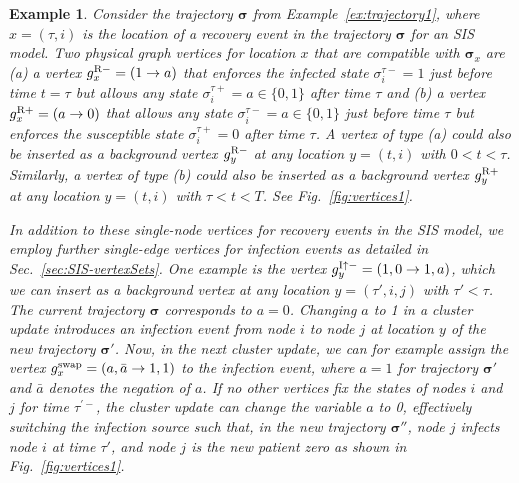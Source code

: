 \documentclass[english,10pt,aps,pra,twocolumn,superscriptaddress,floatfix,fleqn]{revtex4-2}
\renewcommand{\vec}[1]{{\boldsymbol{#1}}}
\newcommand{\vs}{\vec{\sigma}}
\newcommand{\tR}{\textnormal{R}}
\newcommand{\tI}{\textnormal{I}}
\newcommand{\swap}{\textnormal{swap}}
\let\up\uparrow
\newtheorem{example}{Example}
\begin{document}
\begin{example}\label{ex:vertices1}
Consider the trajectory $\vs$ from Example~\ref{ex:trajectory1}, where $x=(\tau,i)$ is the location of a recovery event in the trajectory $\vs$ for an SIS model. Two physical graph vertices for location $x$ that are compatible with $\vs_x$ are (a) a vertex $g^{\tR-}_x=(1\to a)$ that enforces the infected state $\sigma^{\tau-}_i=1$ just before time $t=\tau$ but allows any state $\sigma^{\tau+}_i=a\in\{0,1\}$ after time $\tau$ and (b) a vertex $g^{\tR+}_x=(a\to 0)$ that allows any state $\sigma^{\tau-}_i=a\in\{0,1\}$ just before time $\tau$ but enforces the susceptible state $\sigma^{\tau+}_i=0$ after time $\tau$. A vertex of type (a) could also be inserted as a background vertex $g^{\tR-}_y$ at any location $y=(t,i)$ with $0<t<\tau$. Similarly, a vertex of type (b) could also be inserted as a background vertex $g^{\tR+}_y$ at any location $y=(t,i)$ with $\tau<t<T$. See Fig.~\ref{fig:vertices1}.

In addition to these single-node vertices for recovery events in the SIS model, we employ further single-edge vertices for infection events as detailed in Sec.~\ref{sec:SIS-vertexSets}. One example is the vertex $g^{\tI\up-}_y=(1,0\to 1,a)$, which we can insert as a background vertex at any location $y=(\tau',i,j)$ with $\tau'<\tau$. The current trajectory $\vs$ corresponds to $a=0$. Changing $a$ to 1 in a cluster update introduces an infection event from node $i$ to node $j$ at location $y$ of the new trajectory $\vs'$. Now, in the next cluster update, we can for example assign the vertex $g^\swap_x=(a,\bar{a}\to 1,1)$ to the infection event, where $a=1$ for trajectory $\vs'$ and $\bar{a}$ denotes the negation of $a$. If no other vertices fix the states of nodes $i$ and $j$ for time $\tau^{\prime-}$, the cluster update can change the variable $a$ to 0, effectively switching the infection source such that, in the new trajectory $\vs''$, node $j$ infects node $i$ at time $\tau'$, and node $j$ is the new patient zero as shown in Fig.~\ref{fig:vertices1}.
\end{example}
\end{document}
